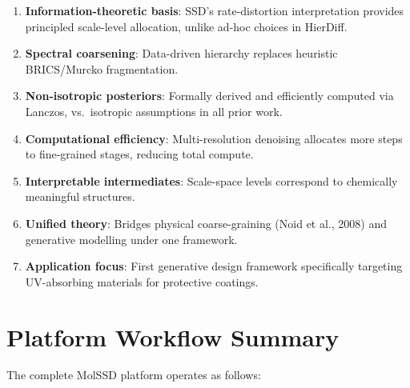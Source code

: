 \documentclass[11pt,a4paper]{article}
\begin{document}
\begin{enumerate}[leftmargin=2em]
  \item \textbf{Information-theoretic basis}: SSD's rate-distortion
    interpretation provides principled scale-level allocation, unlike
    ad-hoc choices in HierDiff.
  \item \textbf{Spectral coarsening}: Data-driven hierarchy replaces
    heuristic BRICS/Murcko fragmentation.
  \item \textbf{Non-isotropic posteriors}: Formally derived and efficiently
    computed via Lanczos, vs.\ isotropic assumptions in all prior work.
  \item \textbf{Computational efficiency}: Multi-resolution denoising
    allocates more steps to fine-grained stages, reducing total compute.
  \item \textbf{Interpretable intermediates}: Scale-space levels correspond
    to chemically meaningful structures.
  \item \textbf{Unified theory}: Bridges physical coarse-graining
    (Noid et al., 2008) and generative modelling under one framework.
  \item \textbf{Application focus}: First generative design framework
    specifically targeting UV-absorbing materials for protective coatings.
\end{enumerate}

\section{Platform Workflow Summary}

The complete MolSSD platform operates as follows:
\end{document}
